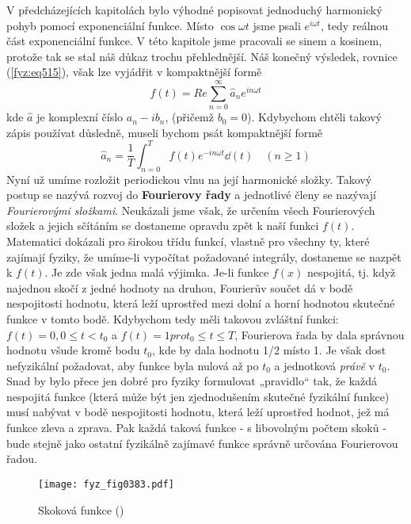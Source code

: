   V předcházejících kapitolách bylo výhodné popisovat jednoduchý harmonický pohyb pomocí 
  exponenciální funkce. Místo \(\cos\omega t\) jsme psali \(e^{i\omega t}\), tedy reálnou část 
  exponenciální funkce. V této kapitole jsme pracovali se sinem a kosinem, protože tak se stal náš 
  důkaz trochu přehlednější. Náš konečný výsledek, rovnice (\ref{fyz:eq515}), však lze vyjádřit v 
  kompaktnější formě
  \begin{equation}\label{fyz:eq517}
    f(t) = Re\sum_{n=0}^{\infty}\hat{a}_n e^{in\omega t}
  \end{equation}
  kde \(\hat{a}\) je komplexní číslo \(a_n - ib_n\), (přičemž \(b_0 = 0\)). Kdybychom chtěli takový 
  zápis používat důsledně, museli bychom psát
  kompaktnější formě
  \begin{equation}\label{fyz:eq518}
    \hat{a}_n = \dfrac{1}{T}\int_{n=0}^{T}f(t) e^{-in\omega t}\dd(t)\quad (n\geq1)
  \end{equation}
  Nyní už umíme rozložit periodickou vlnu na její harmonické složky. Takový postup se nazývá rozvoj 
  do \textbf{Fourierovy řady} a jednotlivé členy se nazývají \emph{Fourierovými složkami}. 
  Neukázali jsme však, že určením všech Fourierových složek a jejich sčítáním se dostaneme opravdu 
  zpět k naší funkci \(f(t)\). Matematici dokázali pro širokou třídu funkcí, vlastně pro všechny 
  ty, které zajímají fyziky, že umíme-li vypočítat požadované integrály, dostaneme se nazpět k 
  \(f(t)\). Je zde však jedna malá výjimka. Je-li funkce \(f(x)\) nespojitá, tj. když najednou 
  skočí z jedné hodnoty na druhou, Fourierův součet dá v bodě nespojitosti hodnotu, která leží 
  uprostřed mezi dolní a horní hodnotou skutečné funkce v tomto bodě. Kdybychom tedy měli takovou 
  zvláštní funkci: \(f(t) = 0, 0 \leq t<t_0\) a \(f(t) = 1 pro t_0 \leq t \leq T\), Fourierova řada 
  by dala správnou hodnotu všude kromě bodu \(t_0\), kde by dala hodnotu \num{1/2} místo \num{1}. 
  Je však dost nefyzikální požadovat, aby funkce byla nulová až po \(t_0\) a jednotková 
  \emph{právě} v \(t_0\).  Snad by bylo přece jen dobré pro fyziky formulovat „pravidlo“ tak, že 
  každá nespojitá funkce (která může být jen zjednodušením skutečné fyzikální funkce) musí nabývat 
  v bodě nespojitosti hodnotu, která leží uprostřed hodnot, jež má funkce zleva a zprava. Pak každá 
  taková funkce - s libovolným počtem skoků - bude stejně jako ostatní fyzikálně zajímavé funkce 
  správně určována Fourierovou řadou.
    
  \begin{figure}[ht!] %
    \centering
    \texttt{[image: fyz\_fig0383.pdf]}
    \caption{Skoková funkce
             (\cite[s.~680]{Feynman01})}
    \label{fyz:fig0383}
  \end{figure}
  
